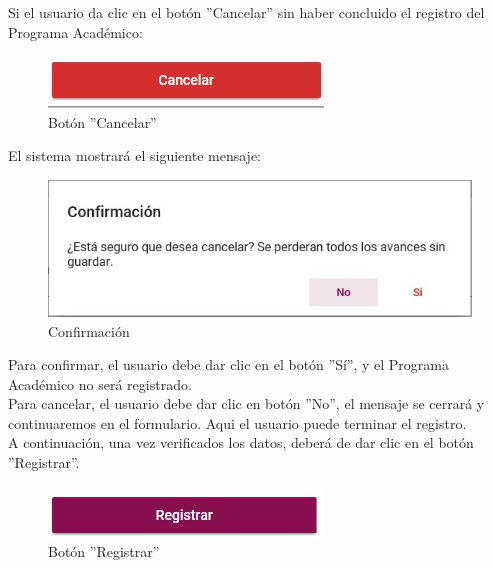         Si el usuario da clic en el botón ''Cancelar'' sin haber concluido el registro del Programa Académico:

        \begin{figure}[H]
            \centering
            \hypertarget{cancel1}{\includegraphics[width=0.7\linewidth]{images/SP3/BtnCancelar}}
            \caption{Botón ''Cancelar''}
            \label{cancel1}
        \end{figure}

         El sistema mostrará el siguiente mensaje:

        \begin{figure}[H]
            \centering
            \hypertarget{confirmar}{\includegraphics[width=0.7\linewidth]{images/SP3/Confirmacion}}
            \caption{Confirmación}
            \label{confirmar}
        \end{figure}

        Para confirmar, el usuario debe dar clic en el botón ''Sí'', y el Programa Académico no será registrado.\\

        Para cancelar, el usuario debe dar clic en botón ''No'', el mensaje se cerrará y continuaremos en el formulario. Aqui el usuario puede terminar el registro.\\

        A continuación, una vez verificados los datos, deberá de dar clic en el botón ''Registrar''.
        \begin{figure}[H]
            \centering
            \hypertarget{btnreg}{\includegraphics[width=0.7\linewidth]{images/SP3/BtnRegistrar}}
            \caption{Botón ''Registrar''}
            \label{btnreg}
        \end{figure}

